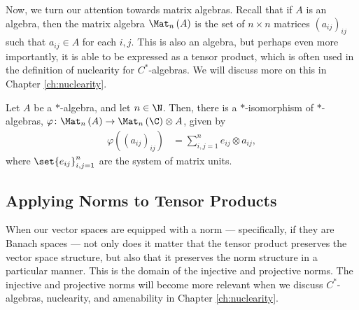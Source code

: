 Now, we turn our attention towards matrix algebras. Recall that if $A$ is an algebra, then the matrix algebra $\Mat_n\left( A \right)$ is the set of $n\times n$ matrices $\left( a_{ij} \right)_{ij}$ such that $a_{ij}\in A$ for each $i,j$. This is also an algebra, but perhaps even more importantly, it is able to be expressed as a tensor product, which is often used in the definition of nuclearity for $C^{\ast}$-algebras. We will discuss more on this in Chapter \ref{ch:nuclearity}.
\begin{theorem}
  Let $A$ be a $\ast$-algebra, and let $n\in \N$. Then, there is a $\ast$-isomorphism of $\ast$-algebras, $\varphi\colon \Mat_n\left( A \right)\rightarrow \Mat_n\left( \C \right)\otimes A$, given by
  \begin{align*}
    \varphi\left( \left( a_{ij} \right)_{ij} \right) &= \sum_{i,j=1}^{n}e_{ij}\otimes a_{ij},
  \end{align*}
  where $\set{e_{ij}}_{i,j=1}^{n}$ are the system of matrix units.
\end{theorem}
\subsection{Applying Norms to Tensor Products}%
When our vector spaces are equipped with a norm --- specifically, if they are Banach spaces --- not only does it matter that the tensor product preserves the vector space structure, but also that it preserves the norm structure in a particular manner. This is the domain of the injective and projective norms. The injective and projective norms will become more relevant when we discuss $C^{\ast}$-algebras, nuclearity, and amenability in Chapter \ref{ch:nuclearity}.\newline
 
